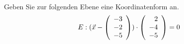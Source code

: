 \begin{aufgabe} ~ \\ 
Geben Sie zur folgenden Ebene eine Koordinatenform an.\[E: (\vec{x} - \Vekd{-3}{-2}{-5}) \cdot \Vekd{2}{-4}{-5} = 0 \]\end{aufgabe} 
